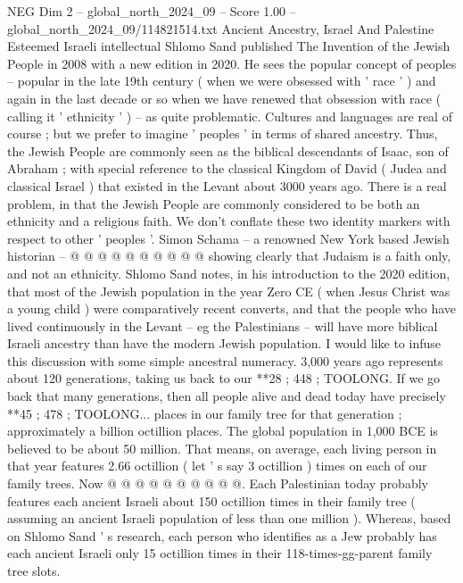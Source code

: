 \begin{textsample}{NEG Dim 2 – global\_north\_2024\_09 – Score 1.00 – global\_north\_2024\_09/114821514.txt}  \label{ex:f2_neg_321}
Ancient Ancestry, Israel And Palestine Esteemed Israeli intellectual Shlomo Sand published The Invention of the Jewish People in 2008 with a new edition in 2020.
He sees the popular concept of peoples -- popular in the late 19th century ( when we were obsessed with ' race ' ) and again in the last decade or so when we have renewed that obsession with race ( calling it ' ethnicity ' ) -- as quite problematic.
Cultures and languages are real of course ; but we prefer to imagine ' peoples ' in terms of shared ancestry.
Thus, the Jewish People are commonly seen as the biblical descendants of Isaac, son of Abraham ; with special reference to the classical Kingdom of David ( Judea and classical Israel ) that existed in the Levant about 3000 years ago.
There is a real problem, in that the Jewish People are commonly considered to be both an ethnicity and a religious faith.
We don't conflate these two identity markers with respect to other ' peoples '.
Simon Schama -- a renowned New York based Jewish historian -- @ @ @ @ @ @ @ @ @ @ showing clearly that Judaism is a faith only, and not an ethnicity.
Shlomo Sand notes, in his introduction to the 2020 edition, that most of the Jewish population in the year Zero CE ( when Jesus Christ was a young child ) were comparatively recent converts, and that the people who have lived continuously in the Levant -- eg the Palestinians -- will have more biblical Israeli ancestry than have the modern Jewish population.
I would like to infuse this discussion with some simple ancestral numeracy. 3,000 years ago represents about 120 generations, taking us back to our **28 ; 448 ; TOOLONG.
If we go back that many generations, then all people alive and dead today have precisely **45 ; 478 ; TOOLONG... places in our family tree for that generation ; approximately a billion octillion places.
The global population in 1,000 BCE is believed to be about 50 million.
That means, on average, each living person in that year features 2.66 octillion ( let ' s say 3 octillion ) times on each of our family trees.
Now @ @ @ @ @ @ @ @ @ @.
Each Palestinian today probably features each ancient Israeli about 150 octillion times in their family tree ( assuming an ancient Israeli population of less than one million ).
Whereas, based on Shlomo Sand ' s research, each person who identifies as a Jew probably has each ancient Israeli only 15 octillion times in their 118-times-gg-parent family tree slots.

\end{textsample}
